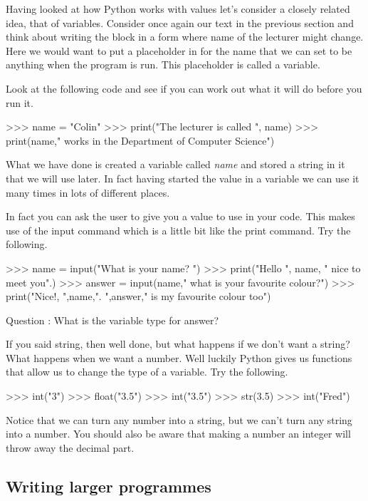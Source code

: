 Having looked at how Python works with values let's  consider a closely related idea, that of variables. Consider once again our text in the previous section and think about writing the block in a form where name of the lecturer might change. Here we would want to put a placeholder in for the name that we can set to be anything when the program is run. This placeholder is called a variable.

Look at the following code and see if you can work out what it will do before you run it.

\begin{python}
>>> name = "Colin"
>>> print("The lecturer is called ", name)
>>> print(name," works in the Department of Computer Science")
\end{python}

What we have done is created a variable called \emph{name} and stored a string in it that we will use later. In fact having started the value in a variable we can use it many times in lots of different places.

In fact you can ask the user to give you a value to use in your code. This makes use of the input command which is a little bit like the print command. Try the following.

\begin{python}
>>> name = input("What is your name? ")
>>> print("Hello ", name, " nice to meet you".)
>>> answer = input(name," what is your favourite colour?")
>>> print("Nice!, ",name,". ",answer," is my favourite colour too")
\end{python}

Question : What is the variable type for answer?

If you said string, then well done, but what happens if we don't want a string? What happens when we want a number. Well luckily Python gives us functions that allow us to change the type of a variable. Try the following.

\begin{python}
>>> int("3")
>>> float("3.5")
>>> int("3.5")
>>> str(3.5)
>>> int("Fred")
\end{python}

Notice that we can turn any number into a string, but we can't turn any string into a number. You should also be aware that making a number an integer will throw away the decimal part.

\subsection{Writing larger programmes}

